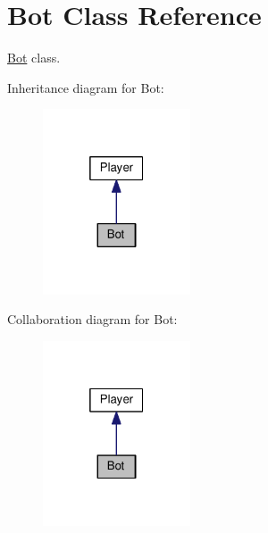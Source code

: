 \hypertarget{classBot}{}\section{Bot Class Reference}
\label{classBot}


\hyperlink{classBot}{Bot} class.  




Inheritance diagram for Bot\+:
\nopagebreak
\begin{figure}[H]
\begin{center}
\leavevmode
\includegraphics[width=124pt]{classBot__inherit__graph}
\end{center}
\end{figure}


Collaboration diagram for Bot\+:
\nopagebreak
\begin{figure}[H]
\begin{center}
\leavevmode
\includegraphics[width=124pt]{classBot__coll__graph}
\end{center}
\end{figure}
